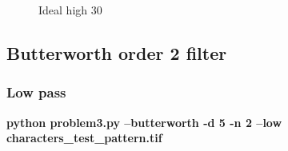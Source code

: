 \begin{figure}[!htb]
\begin{minipage}{0.40\textwidth}
            \caption{\small{Ideal high 30}}\label{diagram:ideal_high_30}
            \end{minipage}
        \end{figure}


    \pagebreak
    \subsection{Butterworth order 2 filter}

        \subsubsection{Low pass}

        \small{\textbf{python problem3.py --butterworth -d 5 -n 2 --low characters\_test\_pattern.tif}}

